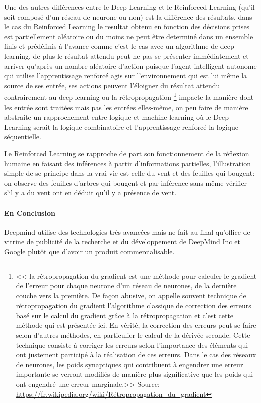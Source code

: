 Une des autres différences entre le Deep Learning et le Reinforced Learning
(qu'il soit composé d'un réseau de neurone ou non) est la différence des résultats,
dans le cas du Reinforced Learning le resultat obtenu en fonction des décisions
prises est partiellement aléatoire ou du moins ne peut être determiné dans un ensemble finis
et prédéfinis à l'avance comme c'est le cas avec un algorithme de deep learning,
de plus le résultat attendu peut ne pas se présenter immédiatement et arriver
qu'après un nombre aléatoire d'action puisque l'agent intelligent autonome qui utilise
l'apprentissage renforcé agis sur l'environnement qui est lui même la source de
ses entrée, ses actions peuvent l'éloigner du résultat attendu contrairement
au deep learning ou la rétropropagation
\footnote{<< la rétropropagation du gradient est une méthode pour calculer le gradient de l'erreur
pour chaque neurone d'un réseau de neurones, de la dernière couche vers la première.
De façon abusive, on appelle souvent technique de rétropropagation du gradient l'algorithme classique
de correction des erreurs basé sur le calcul du gradient grâce à la rétropropagation et
c'est cette méthode qui est présentée ici. En vérité, la correction des erreurs peut se faire selon
d'autres méthodes, en particulier le calcul de la dérivée seconde. Cette technique consiste à corriger
les erreurs selon l'importance des éléments qui ont justement participé à la réalisation de ces erreurs.
Dans le cas des réseaux de neurones, les poids synaptiques qui contribuent à engendrer une
erreur importante se verront modifiés de manière plus significative que les poids qui ont engendré
une erreur marginale.>> \newline
Source: \url{https://fr.wikipedia.org/wiki/Rétropropagation_du_gradient}}
impacte la manière dont les entrée
sont traitées mais pas les entrées elles-même, on peu faire de manière abstraite un rapprochement
entre logique et machine learning où le Deep Learning serait la logique combinatoire et
l'apprentissage renforcé la logique séquentielle. \newline

Le Reinforced Learning se rapproche de part son fonctionnement de la réflexion humaine en faisant 
des inférences à partir d'informations partielles, l'illustration simple de se principe 
dans la vrai vie est celle du vent et des feuilles qui bougent: 
on observe des feuilles d'arbres qui bougent et par inférence sans même vérifier s'il y a du 
vent ont en déduit qu'il y a présence de vent. 

\paragraph{En Conclusion} Deepmind utilise des technologies très avancées mais 
ne fait au final qu'office de vitrine de publicité de la recherche et du développement 
de DeepMind Inc et Google plutôt que d'avoir un produit commercialisable. 



